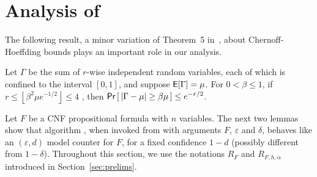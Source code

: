 \section{Analysis of {\ApproxMC}}\label{sec:analysis}
%
%
%

The following result, a minor variation of Theorem~5 
in~\cite{Schmidt}, about Chernoff-Hoeffding bounds plays an important
role in our analysis.
\begin{theorem}\label{theorem:chernoff-hoeffding}
Let $\Gamma$ be the sum of $r$-wise independent random variables, each
of which is confined to the interval $[0, 1]$, and suppose
$\mathsf{E}[\Gamma] = \mu$.  For $0 < \beta \le 1$, if $r \le \left\lfloor
\beta^{2}\mu e^{-1/2} \right\rfloor \leq 4$ , then $\mathsf{Pr}\left[\,|\Gamma - \mu| \ge
  \beta\mu\,\right] \le e^{-r/2}$.
\end{theorem}

Let $F$ be a CNF propositional formula with $n$ variables. The next
two lemmas show that algorithm {\ApproxMCCore}, when invoked from
{\ApproxMC} with arguments $F$, $\varepsilon$ and $\delta$, behaves
like an $(\varepsilon, d)$ model counter for $F$, for a fixed confidence
$1-d$ (possibly different from $1-\delta$).  Throughout this
section, we use the notations $R_F$ and $R_{F,h,\alpha}$ introduced in
Section~\ref{sec:prelims}.

